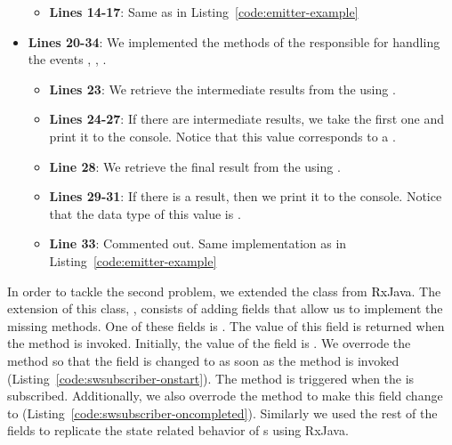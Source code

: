 \documentclass[type=bsc,accentcolor=tud9c]{tudthesis}
\newcommand{\framework}[1]{\textcolor{black}{#1}}
\begin{document}
\begin{itemize}
\begin{itemize}
		\item {\bf Lines 14-17}: Same as in Listing~\ref{code:emitter-example}
		\end{itemize}
	\item {\bf Lines 20-34}: We implemented the methods of the  responsible for handling the events , , .
		\begin{itemize}
			\item {\bf Lines 23}: We retrieve the intermediate results from the  using .
			\item {\bf Lines 24-27}: If there are intermediate results, we take the first one and print it to the console. Notice that this value corresponds to a .
			\item {\bf Line 28}: We retrieve the final result from the  using .
			\item {\bf Lines 29-31}: If there is a result, then we print it to the console. Notice that the data type of this value is .
			\item {\bf Line 33}: Commented out. Same implementation as in Listing~\ref{code:emitter-example}
		\end{itemize}
\end{itemize}



In order to tackle the second problem, we extended the class  from \framework{RxJava}. The extension of this class, , consists of adding fields that allow us to implement the missing methods. One of these fields is . The value of this field is returned when the method  is invoked. Initially, the value of the field is . We overrode the method  so that the field  is changed to  as soon as the method is invoked (Listing~\ref{code:swsubscriber-onstart}). The method  is triggered when the  is subscribed. Additionally, we also overrode the method  to make this field change to  (Listing~\ref{code:swsubscriber-oncompleted}). Similarly we used the rest of the fields to replicate the state related behavior of s using RxJava.


\end{document}
